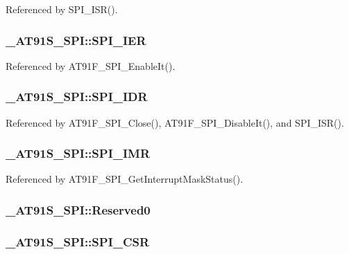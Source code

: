 Referenced by SPI\_\-ISR().\hypertarget{struct__AT91S__SPI_789ac88d795620768b33e76cea5d7c15}{
\subsubsection{ {\bf \_\-AT91S\_\-SPI::SPI\_\-IER}}}
\label{struct__AT91S__SPI_789ac88d795620768b33e76cea5d7c15}




Referenced by AT91F\_\-SPI\_\-EnableIt().\hypertarget{struct__AT91S__SPI_8b1413ef206fd57fcd3dbedaeebbb0a5}{
\subsubsection{ {\bf \_\-AT91S\_\-SPI::SPI\_\-IDR}}}
\label{struct__AT91S__SPI_8b1413ef206fd57fcd3dbedaeebbb0a5}




Referenced by AT91F\_\-SPI\_\-Close(), AT91F\_\-SPI\_\-DisableIt(), and SPI\_\-ISR().\hypertarget{struct__AT91S__SPI_a276a1765641b516aafb1cd399aaca7f}{
\subsubsection{ {\bf \_\-AT91S\_\-SPI::SPI\_\-IMR}}}
\label{struct__AT91S__SPI_a276a1765641b516aafb1cd399aaca7f}




Referenced by AT91F\_\-SPI\_\-GetInterruptMaskStatus().\hypertarget{struct__AT91S__SPI_1bb30be3714bf821c53f14301f302027}{
\subsubsection{ {\bf \_\-AT91S\_\-SPI::Reserved0}}}
\label{struct__AT91S__SPI_1bb30be3714bf821c53f14301f302027}


\hypertarget{struct__AT91S__SPI_bbf4500576969ea8013cca841d0b1979}{
\subsubsection{ {\bf \_\-AT91S\_\-SPI::SPI\_\-CSR}}}
\label{struct__AT91S__SPI_bbf4500576969ea8013cca841d0b1979}




